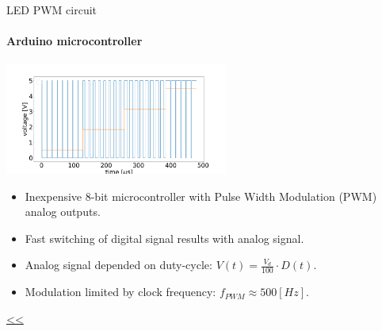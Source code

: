 \documentclass{beamer}
\begin{document}
\begin{frame}{\hypertarget{frame:LED PWM circuit 1}{LED PWM circuit}}
	\framesubtitle{Arduino microcontroller}
	\begin{center}		
		\includegraphics[width=0.55\textwidth,keepaspectratio]{duty_cycle.png}
	\end{center}
	\begin{itemize}		
		\item Inexpensive 8-bit microcontroller with Pulse Width Modulation (PWM) analog outputs.
		\item Fast switching of digital signal results with analog signal.
		\item Analog signal depended on duty-cycle: $V(t) =  \frac{V_d}{100}\cdot D(t)$.
		\item Modulation limited by clock frequency: $f_{PWM} \approx 500[Hz]$.
	\end{itemize}
	\hyperlink{frame:LED PWM circuit}{<<} 
\end{frame}
\end{document}
